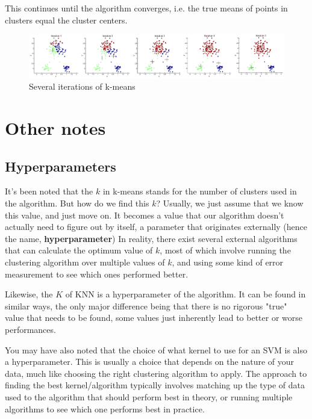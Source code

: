 \documentclass{article}
\begin{document}
This continues until the algorithm converges, i.e. the true means of points in clusters equal the cluster centers.

\begin{figure}[!htb]
    \vspace{-10pt}
    \begin{center}
        \includegraphics[width=1.0\textwidth]{iterations_flat.jpg}
    \end{center}
    \vspace{-20pt}
    \caption{Several iterations of k-means}
    \vspace{-20pt}
\end{figure}

\section{Other notes}

\subsection{Hyperparameters}
It's been noted that the $k$ in k-means stands for the number of clusters used in the algorithm. But how do we find this $k$? Usually, we just assume that we know this value, and just move on. It becomes a value that our algorithm doesn't actually need to figure out by itself, a parameter that originates externally (hence the name, \textbf{hyperparameter}) In reality, there exist several external algorithms that can calculate the optimum value of $k$, most of which involve running the clustering algorithm over multiple values of $k$, and using some kind of error measurement to see which ones performed better.

Likewise, the $K$ of KNN is a hyperparameter of the algorithm. It can be found in similar ways, the only major difference being that there is no rigorous "true" value that needs to be found, some values just inherently lead to better or worse performances.

You may have also noted that the choice of what kernel to use for an SVM is also a hyperparameter. This is usually a choice that depends on the nature of your data, much like choosing the right clustering algorithm to apply. The approach to finding the best kernel/algorithm typically involves matching up the type of data used to the algorithm that should perform best in theory, or running multiple algorithms to see which one performs best in practice.
\end{document}
